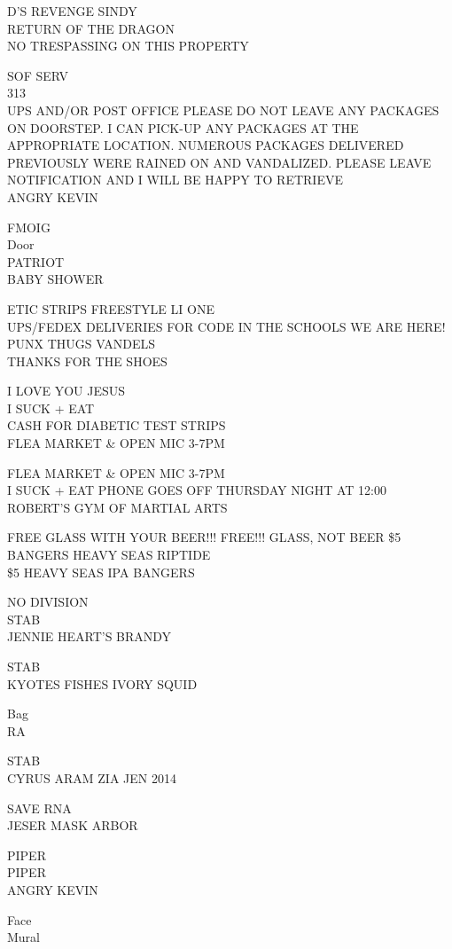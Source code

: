 \documentclass[10pt,letterpaper]{article}
\begin{document}
D'S REVENGE SINDY\\
RETURN OF THE DRAGON\\
NO TRESPASSING ON THIS PROPERTY

SOF SERV\\
313\\
UPS AND/OR POST OFFICE PLEASE DO NOT LEAVE ANY PACKAGES ON DOORSTEP.  I CAN PICK{-}UP ANY PACKAGES AT THE APPROPRIATE LOCATION.  NUMEROUS PACKAGES DELIVERED PREVIOUSLY WERE RAINED ON AND VANDALIZED.  PLEASE LEAVE NOTIFICATION AND I WILL BE HAPPY TO RETRIEVE\\
ANGRY KEVIN

FMOIG\\
Door\\
PATRIOT\\
BABY SHOWER

ETIC STRIPS FREESTYLE LI ONE\\
UPS/FEDEX DELIVERIES FOR CODE IN THE SCHOOLS WE ARE HERE!\\
PUNX THUGS VANDELS\\
THANKS FOR THE SHOES

I LOVE YOU JESUS\\
I SUCK + EAT\\
CASH FOR DIABETIC TEST STRIPS\\
FLEA MARKET \& OPEN MIC 3{-}7PM

FLEA MARKET \& OPEN MIC 3{-}7PM\\
I SUCK + EAT PHONE GOES OFF THURSDAY NIGHT AT 12:00\\
ROBERT'S GYM OF MARTIAL ARTS

FREE GLASS WITH YOUR BEER!!! FREE!!! GLASS, NOT BEER \$5 BANGERS HEAVY SEAS RIPTIDE\\
\$5 HEAVY SEAS IPA BANGERS

NO DIVISION\\
STAB\\
JENNIE HEART'S BRANDY

STAB\\
KYOTES FISHES IVORY SQUID

Bag\\
RA

STAB\\
CYRUS ARAM ZIA JEN 2014

SAVE RNA\\
JESER MASK ARBOR

PIPER\\
PIPER\\
ANGRY KEVIN

Face\\
Mural
\end{document}
